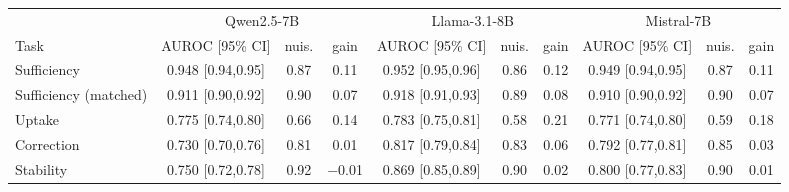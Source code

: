 \begin{tabular}{lccccccccc}
\toprule
& \multicolumn{3}{c}{Qwen2.5-7B} & \multicolumn{3}{c}{Llama-3.1-8B} & \multicolumn{3}{c}{Mistral-7B} \\
\cmidrule(lr){2-4}\cmidrule(lr){5-7}\cmidrule(lr){8-10}
Task & AUROC [95\% CI] & nuis. & gain & AUROC [95\% CI] & nuis. & gain & AUROC [95\% CI] & nuis. & gain \\
\midrule
Sufficiency & 0.948 [0.94,0.95] & 0.87 & 0.11 & 0.952 [0.95,0.96] & 0.86 & 0.12 & 0.949 [0.94,0.95] & 0.87 & 0.11 \\
Sufficiency (matched) & 0.911 [0.90,0.92] & 0.90 & 0.07 & 0.918 [0.91,0.93] & 0.89 & 0.08 & 0.910 [0.90,0.92] & 0.90 & 0.07 \\
Uptake & 0.775 [0.74,0.80] & 0.66 & 0.14 & 0.783 [0.75,0.81] & 0.58 & 0.21 & 0.771 [0.74,0.80] & 0.59 & 0.18 \\
Correction & 0.730 [0.70,0.76] & 0.81 & 0.01 & 0.817 [0.79,0.84] & 0.83 & 0.06 & 0.792 [0.77,0.81] & 0.85 & 0.03 \\
Stability & 0.750 [0.72,0.78] & 0.92 & $-$0.01 & 0.869 [0.85,0.89] & 0.90 & 0.02 & 0.800 [0.77,0.83] & 0.90 & 0.01 \\
\bottomrule
\end{tabular}